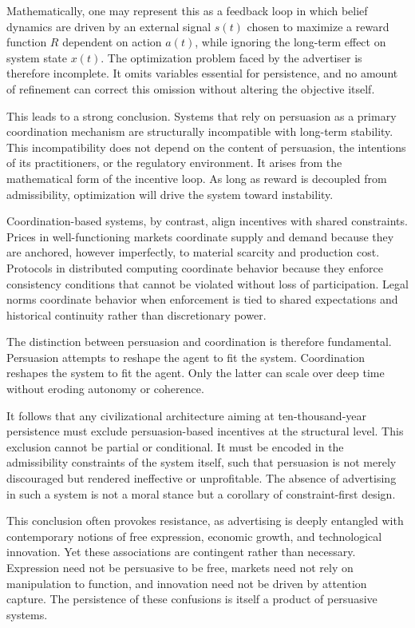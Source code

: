 \documentclass[12pt,oneside]{book}
\begin{document}
Mathematically, one may represent this as a feedback loop in which belief dynamics are driven by an external signal \(s(t)\) chosen to maximize a reward function \(R\) dependent on action \(a(t)\), while ignoring the long-term effect on system state \(x(t)\). The optimization problem faced by the advertiser is therefore incomplete. It omits variables essential for persistence, and no amount of refinement can correct this omission without altering the objective itself.

This leads to a strong conclusion. Systems that rely on persuasion as a primary coordination mechanism are structurally incompatible with long-term stability. This incompatibility does not depend on the content of persuasion, the intentions of its practitioners, or the regulatory environment. It arises from the mathematical form of the incentive loop. As long as reward is decoupled from admissibility, optimization will drive the system toward instability.

Coordination-based systems, by contrast, align incentives with shared constraints. Prices in well-functioning markets coordinate supply and demand because they are anchored, however imperfectly, to material scarcity and production cost. Protocols in distributed computing coordinate behavior because they enforce consistency conditions that cannot be violated without loss of participation. Legal norms coordinate behavior when enforcement is tied to shared expectations and historical continuity rather than discretionary power.

The distinction between persuasion and coordination is therefore fundamental. Persuasion attempts to reshape the agent to fit the system. Coordination reshapes the system to fit the agent. Only the latter can scale over deep time without eroding autonomy or coherence.

It follows that any civilizational architecture aiming at ten-thousand-year persistence must exclude persuasion-based incentives at the structural level. This exclusion cannot be partial or conditional. It must be encoded in the admissibility constraints of the system itself, such that persuasion is not merely discouraged but rendered ineffective or unprofitable. The absence of advertising in such a system is not a moral stance but a corollary of constraint-first design.

This conclusion often provokes resistance, as advertising is deeply entangled with contemporary notions of free expression, economic growth, and technological innovation. Yet these associations are contingent rather than necessary. Expression need not be persuasive to be free, markets need not rely on manipulation to function, and innovation need not be driven by attention capture. The persistence of these confusions is itself a product of persuasive systems.
\end{document}
